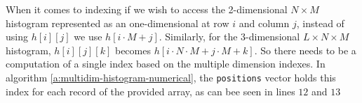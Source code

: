 When it comes to indexing if we wish to access the 2-dimensional $N \times M$ histogram represented as an one-dimensional at row $ i $ and column $ j $, instead of using $h[i][j]$ we use $h[i \cdot M + j]$.
Similarly, for the 3-dimensional $L \times N \times M$ histogram, $h[i][j][k]$ becomes $h[i \cdot N \cdot M + j \cdot M + k]$. So there needs to be a computation of a single index based on the multiple dimension indexes. In algorithm \ref{a:multidim-histogram-numerical}, the \texttt{positions} vector holds this index for each record of the provided array, as can bee seen in lines $ 12 $ and $ 13 $